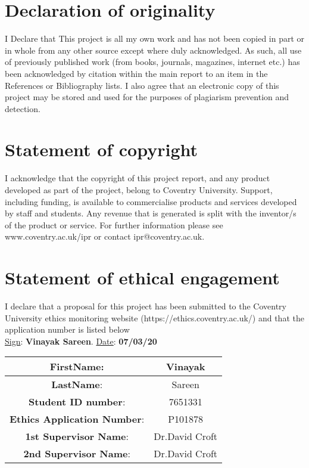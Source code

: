 \section*{Declaration of originality}
I Declare that This project is all my own work and has not been copied in part or in whole from any other source except where duly acknowledged.  As such, all use of previously published work (from books, journals, magazines, internet etc.) has been acknowledged by citation within the main report to an item in the References or Bibliography lists. I also agree that an electronic copy of this project may be stored and used for the purposes of plagiarism prevention and detection.
\section*{Statement of copyright}
I acknowledge that the copyright of this project report, and any product developed as part of the project, belong to Coventry University. 
Support, including funding, is available to commercialise products and services developed by staff and students. 
 Any revenue that is generated is split with the inventor/s of the product or service. 
For further information please see www.coventry.ac.uk/ipr or contact ipr@coventry.ac.uk.
\section*{Statement of ethical engagement}
I declare that a proposal for this project has been submitted to the Coventry University ethics monitoring website (https://ethics.coventry.ac.uk/) and that the application number is listed below \\
\vspace{10mm}
\underline{Sign}: \textbf{Vinayak Sareen}. \hspace{20mm} \underline{Date}:  \textbf{07/03/20}


\begin{tabular} {|c | c|}
\hline
    \textbf{FirstName}:  & Vinayak \\
    \hline
    \textbf{LastName}:  & Sareen \\
    \hline
    \textbf{Student ID number}:  & 7651331 \\
    \hline
    \textbf{Ethics Application Number}: & P101878 \\
    \hline
    \textbf{1st Supervisor Name}: & Dr.David Croft \\
    \hline
    \textbf{2nd Supervisor Name}: & Dr.David Croft \\
\hline
\end{tabular}    